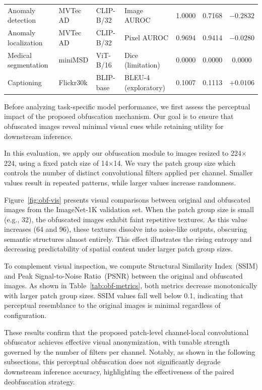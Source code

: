 \documentclass{ieeeaccess}
\newcommand{\rev}[1]{{\color{green}#1}}
\begin{document}
\begin{table}[t]
\begin{tabular}{p{} p{} p{} p{} c c c}
\rev{Anomaly detection} & \rev{MVTec AD} & \rev{CLIP-B/32} & \rev{Image AUROC} & \rev{1.0000} & \rev{0.7168} & \rev{$-0.2832$} \\
\rev{Anomaly localization} & \rev{MVTec AD} & \rev{CLIP-B/32} & \rev{Pixel AUROC} & \rev{0.9694} & \rev{0.9414} & \rev{$-0.0280$} \\
\midrule
\rev{Medical segmentation} & \rev{miniMSD} & \rev{ViT-B/16} & \rev{Dice (limitation)} & \rev{0.0000} & \rev{0.0000} & \rev{0.0000} \\
\rev{Captioning} & \rev{Flickr30k} & \rev{BLIP-base} & \rev{BLEU-4 (exploratory)} & \rev{0.1007} & \rev{0.1113} & \rev{$+0.0106$} \\
\bottomrule
\end{tabular}
\end{table}


Before analyzing task-specific model performance, we first assess the perceptual impact of the proposed obfuscation mechanism. Our goal is to ensure that obfuscated images reveal minimal visual cues while retaining utility for downstream inference.

In this evaluation, we apply our obfuscation module to images resized to 224$\times$224, using a fixed patch size of 14$\times$14. We vary the patch group size which controls the number of distinct convolutional filters applied per channel. Smaller values result in repeated patterns, while larger values increase randomness.

Figure~\ref{fig:obf-vis} presents visual comparisons between original and obfuscated images from the ImageNet-1K validation set. When the patch group size is small (e.g., 32), the obfuscated images exhibit faint repetitive textures. As this value increases (64 and 96), these textures dissolve into noise-like outputs, obscuring semantic structures almost entirely. This effect illustrates the rising entropy and decreasing predictability of spatial content under larger patch group sizes.

To complement visual inspection, we compute Structural Similarity Index~(SSIM) and Peak Signal-to-Noise Ratio~(PSNR) between the original and obfuscated images. As shown in Table~\ref{tab:obf-metrics}, both metrics decrease monotonically with larger patch group sizes. SSIM values fall well below 0.1, indicating that perceptual resemblance to the original images is minimal regardless of configuration.

These results confirm that the proposed patch-level channel-local convolutional obfuscator achieves effective visual anonymization, with tunable strength governed by the number of filters per channel. Notably, as shown in the following subsections, this perceptual obfuscation does not significantly degrade downstream inference accuracy, highlighting the effectiveness of the paired deobfuscation strategy.
\end{document}
